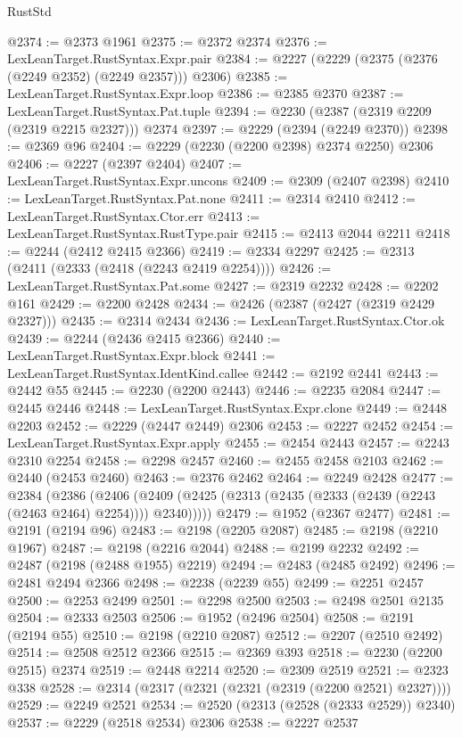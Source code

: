 \begin{lexlean}{RustStd}
\begin{coremodule}
@2374 := @2373 @1961
@2375 := @2372 @2374
@2376 := LexLeanTarget.RustSyntax.Expr.pair
@2384 := @2227 (@2229 (@2375 (@2376 (@2249 @2352) (@2249 @2357))) @2306)
@2385 := LexLeanTarget.RustSyntax.Expr.loop
@2386 := @2385 @2370
@2387 := LexLeanTarget.RustSyntax.Pat.tuple
@2394 := @2230 (@2387 (@2319 @2209 (@2319 @2215 @2327))) @2374
@2397 := @2229 (@2394 (@2249 @2370))
@2398 := @2369 @96
@2404 := @2229 (@2230 (@2200 @2398) @2374 @2250) @2306
@2406 := @2227 (@2397 @2404)
@2407 := LexLeanTarget.RustSyntax.Expr.uncons
@2409 := @2309 (@2407 @2398)
@2410 := LexLeanTarget.RustSyntax.Pat.none
@2411 := @2314 @2410
@2412 := LexLeanTarget.RustSyntax.Ctor.err
@2413 := LexLeanTarget.RustSyntax.RustType.pair
@2415 := @2413 @2044 @2211
@2418 := @2244 (@2412 @2415 @2366)
@2419 := @2334 @2297
@2425 := @2313 (@2411 (@2333 (@2418 (@2243 @2419 @2254))))
@2426 := LexLeanTarget.RustSyntax.Pat.some
@2427 := @2319 @2232
@2428 := @2202 @161
@2429 := @2200 @2428
@2434 := @2426 (@2387 (@2427 (@2319 @2429 @2327)))
@2435 := @2314 @2434
@2436 := LexLeanTarget.RustSyntax.Ctor.ok
@2439 := @2244 (@2436 @2415 @2366)
@2440 := LexLeanTarget.RustSyntax.Expr.block
@2441 := LexLeanTarget.RustSyntax.IdentKind.callee
@2442 := @2192 @2441
@2443 := @2442 @55
@2445 := @2230 (@2200 @2443)
@2446 := @2235 @2084
@2447 := @2445 @2446
@2448 := LexLeanTarget.RustSyntax.Expr.clone
@2449 := @2448 @2203
@2452 := @2229 (@2447 @2449) @2306
@2453 := @2227 @2452
@2454 := LexLeanTarget.RustSyntax.Expr.apply
@2455 := @2454 @2443
@2457 := @2243 @2310 @2254
@2458 := @2298 @2457
@2460 := @2455 @2458 @2103
@2462 := @2440 (@2453 @2460)
@2463 := @2376 @2462
@2464 := @2249 @2428
@2477 := @2384
    (@2386
      (@2406 (@2409 (@2425 (@2313 (@2435 (@2333 (@2439 (@2243 (@2463 @2464) @2254)))) @2340)))))
@2479 := @1952 (@2367 @2477)
@2481 := @2191 (@2194 @96)
@2483 := @2198 (@2205 @2087)
@2485 := @2198 (@2210 @1967)
@2487 := @2198 (@2216 @2044)
@2488 := @2199 @2232
@2492 := @2487 (@2198 (@2488 @1955) @2219)
@2494 := @2483 (@2485 @2492)
@2496 := @2481 @2494 @2366
@2498 := @2238 (@2239 @55)
@2499 := @2251 @2457
@2500 := @2253 @2499
@2501 := @2298 @2500
@2503 := @2498 @2501 @2135
@2504 := @2333 @2503
@2506 := @1952 (@2496 @2504)
@2508 := @2191 (@2194 @55)
@2510 := @2198 (@2210 @2087)
@2512 := @2207 (@2510 @2492)
@2514 := @2508 @2512 @2366
@2515 := @2369 @393
@2518 := @2230 (@2200 @2515) @2374
@2519 := @2448 @2214
@2520 := @2309 @2519
@2521 := @2323 @338
@2528 := @2314 (@2317 (@2321 (@2321 (@2319 (@2200 @2521) @2327))))
@2529 := @2249 @2521
@2534 := @2520 (@2313 (@2528 (@2333 @2529)) @2340)
@2537 := @2229 (@2518 @2534) @2306
@2538 := @2227 @2537

\end{coremodule}
\end{lexlean}
